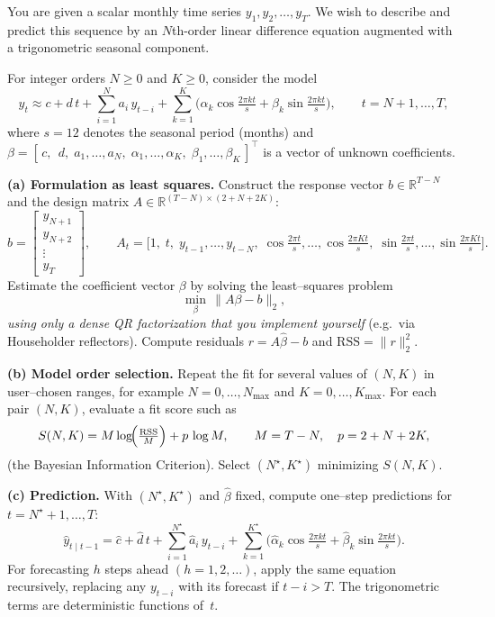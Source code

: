 \begin{problem}
You are given a scalar monthly time series $y_1, y_2, \dots, y_T$.
We wish to describe and predict this sequence by an $N$th-order
linear difference equation augmented with a trigonometric seasonal component.

\medskip
For integer orders $N \ge 0$ and $K \ge 0$, consider the model
\[
y_t \approx
c + d\,t
+ \sum_{i=1}^{N} a_i\,y_{t-i}
+ \sum_{k=1}^{K} \!\Big(
  \alpha_k \cos\!\tfrac{2\pi k t}{s}
  + \beta_k \sin\!\tfrac{2\pi k t}{s}
\Big),
\qquad t = N+1, \dots, T,
\]
where $s=12$ denotes the seasonal period (months) and
$\beta = [\,c,\;\,d,\;a_1,\dots,a_N,\;\alpha_1,\dots,\alpha_K,\;\beta_1,\dots,\beta_K\,]^\top$
is a vector of unknown coefficients.

\medskip
\textbf{(a) Formulation as least squares.}
Construct the response vector $b\in\mathbb{R}^{T-N}$ and the design matrix
$A\in\mathbb{R}^{(T-N)\times(2+N+2K)}$:
\[
b =
\begin{bmatrix}
y_{N+1}\\
y_{N+2}\\
\vdots\\
y_T
\end{bmatrix},
\qquad
A_t =
\big[
1,\;
t,\;
y_{t-1},\dots,y_{t-N},\;
\cos\tfrac{2\pi t}{s},\dots,\cos\tfrac{2\pi K t}{s},\;
\sin\tfrac{2\pi t}{s},\dots,\sin\tfrac{2\pi K t}{s}
\big].
\]
Estimate the coefficient vector $\beta$ by solving the least--squares problem
\[
\min_{\beta}\,\|A\beta - b\|_2,
\]
\emph{using only a dense QR factorization that you implement yourself}
(e.g.\ via Householder reflectors).
Compute residuals $r=A\hat\beta - b$ and
$\mathrm{RSS} = \|r\|_2^2$.

\medskip
\textbf{(b) Model order selection.}
Repeat the fit for several values of $(N,K)$ in user--chosen ranges,
for example $N=0,\dots,N_{\max}$ and $K=0,\dots,K_{\max}$.
For each pair $(N,K)$, evaluate a fit score such as
\[
S(N,K) =
M\log\!\Bigl(\tfrac{\mathrm{RSS}}{M}\Bigr)
+ p\,\log M,
\qquad
M=T-N,\quad
p = 2 + N + 2K,
\]
(the Bayesian Information Criterion).
Select $(N^\star,K^\star)$ minimizing $S(N,K)$.

\medskip
\textbf{(c) Prediction.}
With $(N^\star,K^\star)$ and $\hat\beta$ fixed,
compute one--step predictions for
$t=N^\star+1,\dots,T$:
\[
\widehat y_{t\mid t-1}
= \hat c
  + \hat d \, t
  + \sum_{i=1}^{N^\star}\hat a_i\,y_{t-i}
  + \sum_{k=1}^{K^\star}
      \big(
        \hat\alpha_k \cos\tfrac{2\pi k t}{s}
        + \hat\beta_k \sin\tfrac{2\pi k t}{s}
      \big).
\]
For forecasting $h$ steps ahead $(h=1,2,\dots)$, apply the same equation recursively,
replacing any $y_{t-i}$ with its forecast if $t-i>T$.
The trigonometric terms are deterministic functions of~$t$.


\end{problem}
